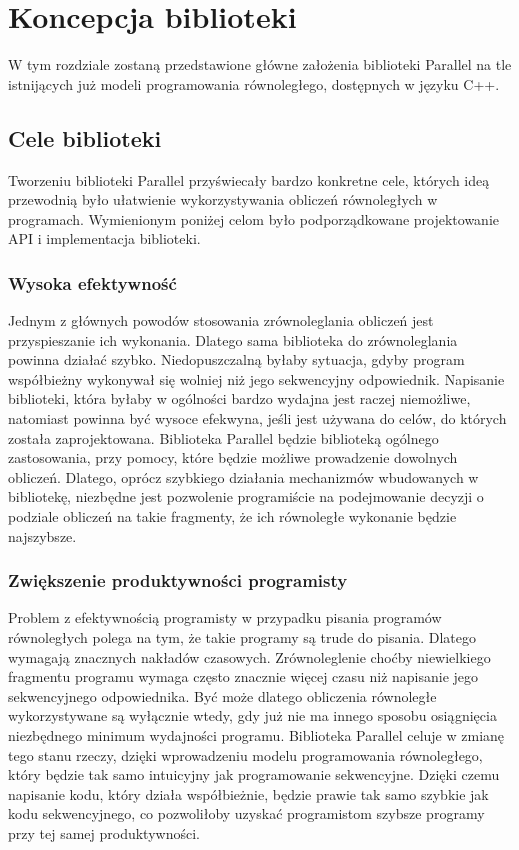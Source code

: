 
\chapter{Koncepcja biblioteki}\label{r:koncepcja}

  W tym rozdziale zostaną przedstawione główne założenia biblioteki Parallel na tle istnijących już modeli programowania równoległego, dostępnych w języku C++.

\section{Cele biblioteki}

  Tworzeniu biblioteki Parallel przyświecały bardzo konkretne cele, których ideą przewodnią było ułatwienie wykorzystywania obliczeń równoległych w programach.
  Wymienionym poniżej celom było podporządkowane projektowanie API i implementacja biblioteki.

\subsection{Wysoka efektywność}

  Jednym z głównych powodów stosowania zrównoleglania obliczeń jest przyspieszanie ich wykonania. Dlatego sama biblioteka do zrównoleglania powinna działać szybko.
  Niedopuszczalną byłaby sytuacja, gdyby program współbieżny wykonywał się wolniej niż jego sekwencyjny odpowiednik.
  Napisanie biblioteki, która byłaby w ogólności bardzo wydajna jest raczej niemożliwe, natomiast powinna być wysoce efekwyna, jeśli jest używana do celów, do których została zaprojektowana.
  Biblioteka Parallel będzie biblioteką ogólnego zastosowania, przy pomocy, które będzie możliwe prowadzenie dowolnych obliczeń.
  Dlatego, oprócz szybkiego działania mechanizmów wbudowanych w bibliotekę, niezbędne jest pozwolenie programiście na podejmowanie decyzji o podziale obliczeń na takie fragmenty, że ich równoległe wykonanie będzie najszybsze.
  
\subsection{Zwiększenie produktywności programisty}
  Problem z efektywnością programisty w przypadku pisania programów równoległych polega na tym, że takie programy są trude do pisania.
  Dlatego wymagają znacznych nakładów czasowych.
  Zrównoleglenie choćby niewielkiego fragmentu programu wymaga często znacznie więcej czasu niż napisanie jego sekwencyjnego odpowiednika.
  Być może dlatego obliczenia równoległe wykorzystywane są wyłącznie wtedy, gdy już nie ma innego sposobu osiągnięcia niezbędnego minimum wydajności programu.
  Biblioteka Parallel celuje w zmianę tego stanu rzeczy, dzięki wprowadzeniu modelu programowania równoległego, który będzie tak samo intuicyjny jak programowanie sekwencyjne.
  Dzięki czemu napisanie kodu, który działa współbieżnie, będzie prawie tak samo szybkie jak kodu sekwencyjnego, co pozwoliłoby uzyskać programistom szybsze programy przy tej samej produktywności.

